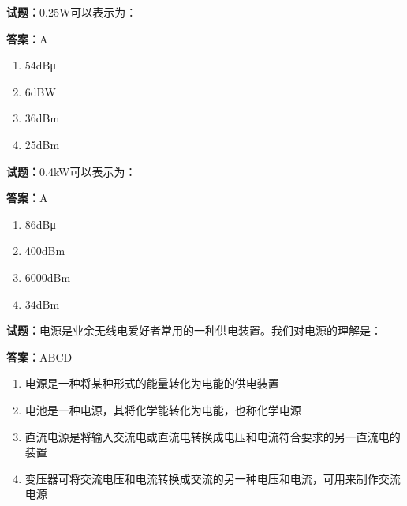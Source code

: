 \documentclass{ctexbook}
\begin{document}





\vspace{1em}

\textbf{试题：}0.25W可以表示为： 

\textbf{答案：}A 

\begin{enumerate}[leftmargin=3em]
  \item 54dBμ 

  \item 6dBW 

  \item 36dBm 

  \item 25dBm 

\end{enumerate}





\vspace{1em}

\textbf{试题：}0.4kW可以表示为： 

\textbf{答案：}A 

\begin{enumerate}[leftmargin=3em]
  \item 86dBμ 

  \item 400dBm 

  \item 6000dBm 

  \item 34dBm 

\end{enumerate}





\vspace{1em}

\textbf{试题：}电源是业余无线电爱好者常用的一种供电装置。我们对电源的理解是： 

\textbf{答案：}ABCD 

\begin{enumerate}[leftmargin=3em]
  \item 电源是一种将某种形式的能量转化为电能的供电装置 

  \item 电池是一种电源，其将化学能转化为电能，也称化学电源 

  \item 直流电源是将输入交流电或直流电转换成电压和电流符合要求的另一直流电的装置 

  \item 变压器可将交流电压和电流转换成交流的另一种电压和电流，可用来制作交流电源 

\end{enumerate}
\end{document}
